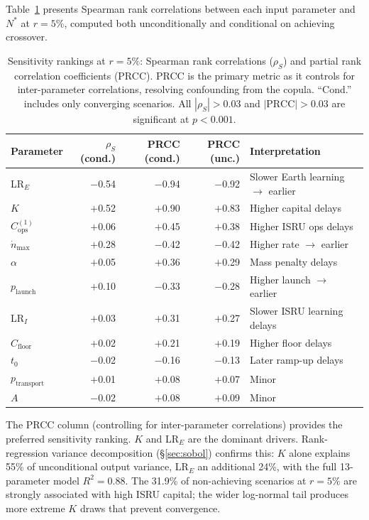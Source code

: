 \documentclass[preprint,12pt]{elsarticle}
\begin{document}
Table~\ref{tab:spearman} presents Spearman rank correlations between each input parameter and $N^*$ at $r = 5\%$, computed both unconditionally and conditional on achieving crossover.
\begin{table}[htbp]
\centering
\caption{Sensitivity rankings at $r = 5\%$: Spearman rank correlations ($\rho_S$) and partial rank correlation coefficients (PRCC). PRCC is the primary metric as it controls for inter-parameter correlations, resolving confounding from the copula. ``Cond.'' includes only converging scenarios. All $|\rho_S| > 0.03$ and $|\text{PRCC}| > 0.03$ are significant at $p < 0.001$.}
\label{tab:spearman}
\begin{tabular}{@{}lrrrp{3.2cm}@{}}
\toprule
Parameter & $\rho_S$ (cond.) & PRCC (cond.) & PRCC (unc.) & Interpretation \\
\midrule
LR$_E$     & $-$0.54 & $-$0.94 & $-$0.92 & Slower Earth learning $\rightarrow$ earlier \\
$K$               & $+$0.52 & $+$0.90 & $+$0.83 & Higher capital delays \\
$C_{\mathrm{ops}}^{(1)}$ & $+$0.06 & $+$0.45 & $+$0.38 & Higher ISRU ops delays \\
$\dot{n}_{\max}$ & $+$0.28 & $-$0.42 & $-$0.42 & Higher rate $\rightarrow$ earlier \\
$\alpha$          & $+$0.05 & $+$0.36 & $+$0.29 & Mass penalty delays \\
$p_{\mathrm{launch}}$   & $+$0.10 & $-$0.33 & $-$0.28 & Higher launch $\rightarrow$ earlier \\
LR$_I$      & $+$0.03 & $+$0.31 & $+$0.27 & Slower ISRU learning delays \\
$C_{\mathrm{floor}}$ & $+$0.02 & $+$0.21 & $+$0.19 & Higher floor delays \\
$t_0$             & $-$0.02 & $-$0.16 & $-$0.13 & Later ramp-up delays \\
$p_{\mathrm{transport}}$ & $+$0.01 & $+$0.08 & $+$0.07 & Minor \\
$A$ & $-$0.02 & $+$0.08 & $+$0.09 & Minor \\
\bottomrule
\end{tabular}
\end{table}

The PRCC column (controlling for inter-parameter correlations) provides the preferred sensitivity ranking. $K$ and LR$_E$ are the dominant drivers. Rank-regression variance decomposition (\S\ref{sec:sobol}) confirms this: $K$ alone explains 55\% of unconditional output variance, LR$_E$ an additional 24\%, with the full 13-parameter model $R^2 = 0.88$. The 31.9\% of non-achieving scenarios at $r = 5\%$ are strongly associated with high ISRU capital; the wider log-normal tail produces more extreme $K$ draws that prevent convergence.
\end{document}
